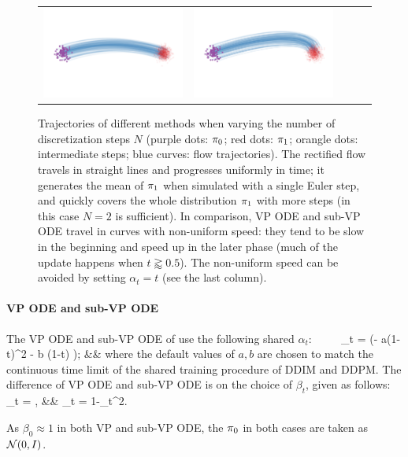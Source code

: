\begin{figure}[h]
{\begin{tabular}{c|c|c|c|c}
    \includegraphics[width=.2\textwidth, trim={0cm 3cm 0 \trimlen},clip]{arxiv_figures/gg_sub_vpsde_100steps.png}  & 
    \includegraphics[width=.2\textwidth, trim={0cm 3cm 0 \trimlen},clip]{arxiv_figures/gg_linear_prev_100steps.png}     
\end{tabular}  
}
    \caption{Trajectories of different methods when varying the number of discretization steps $N$ (purple dots: ${\pi}_0$; red dots: ${\pi}_1$; orangle dots: intermediate steps; blue curves: flow trajectories).  
    The rectified flow travels in straight lines and progresses uniformly in time; 
    it generates the mean of ${\pi}_1$ when simulated with a single Euler step, and quickly covers the whole distribution ${\pi}_1$ with more steps (in this case $N=2$ is sufficient). %
    In comparison, 
    VP ODE and sub-VP ODE travel in curves with non-uniform speed: they tend to be slow in the beginning and speed up in the later phase (much of the update happens when $t{ \scriptstyle\gtrapprox}0.5$). The non-uniform speed can be avoided by setting $\alpha_t =t $ (see the last column). 
    }
    \label{fig:speedtoy}
\end{figure}


\paragraph{VP ODE and sub-VP ODE} 
The VP ODE and sub-VP ODE 
of \cite{song2020score}
 use the following shared $\alpha_t$: 
\bbb \label{equ:vpode}
~~~~
\alpha_t = \exp\left (- a(1-t)^2 %
- b (1-t) 
\right );  && 
\eee  
where the default values of  $a,b$ are %
 chosen to match the continuous time limit of the shared training procedure of DDIM and DDPM. 
 The difference of VP ODE and sub-VP ODE is on the choice of $\beta_t$, given as follows:
\bbb \label{equ:vpodebeta} 
\beta_t = ,  &&
\beta_t = {1-\alpha_t^2}. 
\eee  

As $\beta_0 \approx 1$ in both VP and sub-VP ODE, 
the ${\pi}_0$ in both cases are taken as  $\mathcal{N}(0,I)$. %

